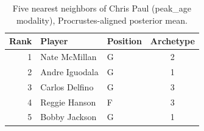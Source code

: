 \begin{table}[htbp]
  \centering\small
  \begin{tabular}{rllc}
    \toprule
    Rank & Player & Position & Archetype \\
    \midrule
    1 & Nate McMillan & G & 2 \\
    2 & Andre Iguodala & G & 1 \\
    3 & Carlos Delfino & G & 3 \\
    4 & Reggie Hanson & F & 3 \\
    5 & Bobby Jackson & G & 1 \\
    \bottomrule
  \end{tabular}
  \caption{Five nearest neighbors of Chris Paul (peak_age modality), Procrustes-aligned posterior mean.}
  \label{tab:Chris_Paul_neighbors_peak_age}
\end{table}

